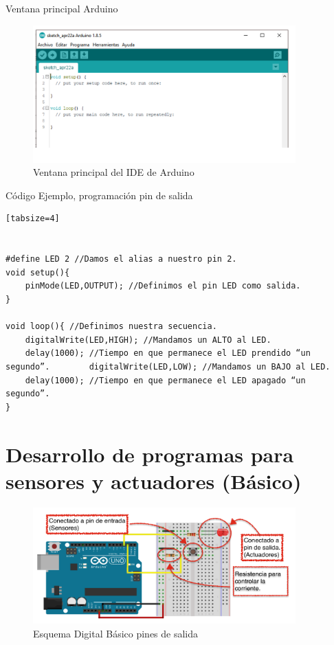 \documentclass{beamer}
\theoremstyle{definition}
\begin{document}
\begin{frame}{Ventana principal Arduino}


\begin{figure}
\centering
\includegraphics[width=0.9\textwidth]{figures/arduinoide.png}
\caption{Ventana principal del IDE de Arduino}
\end{figure}

\end{frame}


\begin{frame}[fragile]
{Código Ejemplo, programación pin de salida}
\tiny
\begin{verbatim}[tabsize=4]


#define LED 2 //Damos el alias a nuestro pin 2.
void setup(){
	pinMode(LED,OUTPUT); //Definimos el pin LED como salida. 
}

void loop(){ //Definimos nuestra secuencia.
	digitalWrite(LED,HIGH); //Mandamos un ALTO al LED.
	delay(1000); //Tiempo en que permanece el LED prendido “un segundo”. 		digitalWrite(LED,LOW); //Mandamos un BAJO al LED.
	delay(1000); //Tiempo en que permanece el LED apagado “un segundo”. 
}

\end{verbatim}
\end{frame}

\section{Desarrollo de programas para sensores y actuadores (Básico)}

\begin{frame}


\begin{figure}
\centering
\includegraphics[width=0.9\textwidth]{figures/esquemaiodigital.png}
\caption{Esquema Digital Básico pines de salida}
\end{figure}



\end{frame}
\end{document}
